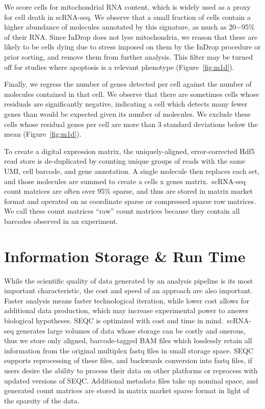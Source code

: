 We score cells for mitochondrial RNA content, which is widely used as a proxy for cell death in scRNA-seq. 
We observe that a small fraction of cells contain a higher abundance of molecules annotated by this signature, as much as 20−95\% of their RNA\@. 
Since InDrop does not lyse mitochondria, we reason that these are likely to be cells dying due to stress imposed on them by the InDrop procedure or prior sorting, and remove them from further analysis. 
This filter may be turned off for studies where apoptosis is a relevant phenotype (Figure~\ref{fig:m1d}).

Finally, we regress the number of genes detected per cell against the number of molecules contained in that cell. 
We observe that there are sometimes cells whose residuals are significantly negative, indicating a cell which detects many fewer genes than would be expected given its number of molecules. 
We exclude these cells whose residual genes per cell are more than 3 standard deviations
below the mean (Figure~\ref{fig:m1d}).

To create a digital expression matrix, the uniquely-aligned, error-corrected Hdf5 read store is de-duplicated by counting unique groups of reads with the same UMI, cell barcode, and gene annotation. 
A single molecule then replaces each set, and those molecules are summed to create a cells x genes matrix.\ 
scRNA-seq count matrices are often over 95\% sparse, and thus are stored in matrix market format and operated on as coordinate sparse or compressed sparse row matrices. 
We call these count matrices ``raw'' count matrices because they contain all barcodes observed in an experiment.

\section{Information Storage \& Run Time}

While the scientific quality of data generated by an analysis pipeline is its most important characteristic, the cost and speed of an approach are also important. 
Faster analysis means faster technological iteration, while lower cost allows for additional data production, which may increase experimental power to answer biological hypotheses. 
SEQC is optimized with cost and time in mind.\ 
scRNA-seq generates large volumes of data whose storage can be costly and onerous, thus we store only aligned, barcode-tagged BAM files which losslessly retain all information from the original multiplex fastq files in small storage space. 
SEQC supports reprocessing of these files, and backwards conversion into fastq files, if users desire the ability to process their data on other platforms or reprocess with updated versions of SEQC\@. 
Additional metadata files take up nominal space, and generated count matrices are stored in matrix market sparse format in light of the sparsity of the data. 

